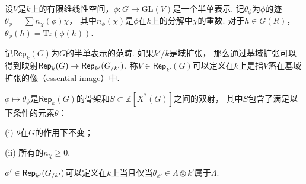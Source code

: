 设$V$是$k$上的有限维线性空间，$\phi: G\to \mathrm{GL}(V)$是一个半单表示.
记$\theta_{\phi}$为$\phi$的迹$\theta_{\phi} = \sum n_{\chi}(\phi)\chi$，
其中$n_{\phi}(\chi)$是$\phi$在$\overline{k}$上的分解中$\chi$的重数.
对于$h\in G(R)$，$\theta_{\phi}(h) = \mathrm{Tr}(\phi(h))$.

记$\mathsf{Rep}_{k}(G)$为$G$的半单表示的范畴. 如果$k'/k$是域扩张，
那么通过基域扩张可以得到映射$\mathsf{Rep}_{k}(G)\to \mathsf{Rep}_{k'}({G}_{/k'})$.
称$V\in \mathsf{Rep}_{k'}(G)$可以定义在$k$上是指$V$落在基域扩张的像（essential image）中.

\begin{cprop}
    $\phi\mapsto \theta_{\phi}$是$\mathsf{Rep}_{k}(G)$的骨架和$S \subset \mathbb{Z}[X^{*}(G)]$之间的双射，
    其中$S$包含了满足以下条件的元素$\theta$：

    (i) $\theta$在$G$的作用下不变；

    (ii) 所有的$n_{\chi}\geq 0$.
\end{cprop}

\begin{ccor}
    $\phi'\in \mathsf{Rep}_{k'}({G}_{/k'})$可以定义在$k$上当且仅当$\theta_{\phi'}\in \Lambda \otimes k'$属于$\Lambda$.
\end{ccor}
